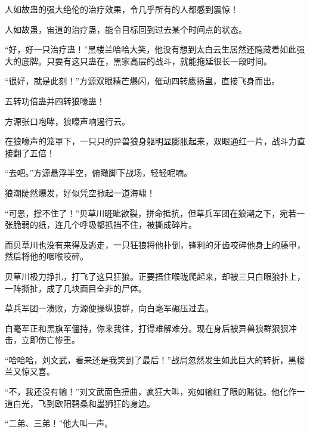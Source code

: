 \begin{this_body}
人如故蛊的强大绝伦的治疗效果，令几乎所有的人都感到震惊！

人如故蛊，宙道的治疗蛊，能令目标回到过去某个时间点的状态。

“好，好一只治疗蛊！”黑楼兰哈哈大笑，他没有想到太白云生居然还隐藏着如此强大的底牌。只要有这只蛊在，黑家高层的战斗，就能拖延很长一段时间。

“很好，就是此刻！”方源双眼精芒爆闪，催动四转鹰扬蛊，直接飞身而出。

五转功倍蛊并四转狼嚎蛊！

方源张口咆哮，狼嚎声响遏行云。

在狼嚎声的笼罩下，一只只的异兽狼身躯明显膨胀起来，双眼通红一片，战斗力直接翻了五倍！

“去吧。”方源悬浮半空，俯瞰脚下战场，轻轻呢喃。

狼潮陡然爆发，好似凭空掀起一道海啸！

“可恶，撑不住了！”贝草川睚眦欲裂，拼命抵抗，但草兵军团在狼潮之下，宛若一张脆弱的纸，连几个呼吸都抵挡不住，被撕成碎片。

而贝草川也没有来得及逃走，一只狂狼将他扑倒，锋利的牙齿咬碎他身上的藤甲，然后将他的咽喉咬碎。

贝草川极力挣扎，打飞了这只狂狼。正要捂住喉咙爬起来，却被三只白眼狼扑上，一阵撕扯，成了几块面目全非的尸体。

草兵军团一溃败，方源便操纵狼群，向白毫军碾压过去。

白毫军正和黑旗军僵持，你来我往，打得难解难分。现在身后被异兽狼群狠狠冲击，立即伤亡惨重。

“哈哈哈，刘文武，看来还是我笑到了最后！”战局忽然发生如此巨大的转折，黑楼兰又惊又喜。

“不，我还没有输！”刘文武面色扭曲，疯狂大叫，宛如输红了眼的赌徒。他化作一道白光，飞到欧阳碧桑和墨狮狂的身边。

“二弟、三弟！”他大叫一声。

\end{this_body}

